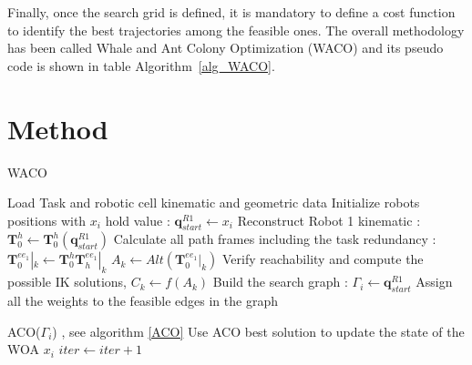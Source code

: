 \documentclass[twocolumn]{svjour3}
\newcommand{\R}[1]{R#1}
\newcommand{\RA}{\R{1}}
\newcommand{\RB}{\R{2}}
\newcommand{\qrA}{\mathbf{q}^{\RA}}
\newcommand{\Tr}[2]{\mathbf{T}^{#2}_{#1}}
\newcommand{\ToolRk}[2]{\Tr{#1}{ee_#2}|_k}
\newcommand{\ToolRAk}[1]{\ToolRk{#1}{1}}
\begin{document}
Finally, once the search grid is defined, it is mandatory to define a cost function to identify the best trajectories among the feasible ones.
The overall methodology has been called Whale and Ant Colony Optimization (WACO) and its pseudo code is shown in table Algorithm~\ref{alg_WACO}.
\section{Method}
\label{WACO}


\begin{algorithm*}[t!]
	\footnotesize
	\caption{WACO}
	\label{alg_WACO}
	\begin{algorithmic}[1]
		\State Load Task and robotic cell kinematic and geometric data
    		    \State Initialize robots positions with $x_i$ hold value : $\qrA_{start} \leftarrow x_i$
        		\State Reconstruct Robot 1 kinematic : $\Tr{0}{h} \leftarrow \Tr{0}{h}(\qrA_{start})$
        		\State Calculate all path frames including the task redundancy :
        		    \State $\ToolRAk{0} \leftarrow \Tr{0}{h} \ToolRAk{h}$
        		    \State  $A_k \leftarrow Alt\left(\ToolRAk{0}\right)$
        		    \hspace{25em}
        		    \State Verify reachability and compute the possible IK solutions, $C_k \leftarrow f(A_k)$
        		\EndFor
        		\State Build the search graph : $\Gamma_i \leftarrow \qrA_{start}$
        		\State Assign all the weights to the feasible edges in the graph
        		        
        		\State ACO($\Gamma_i$) , see algorithm \ref{ACO}
        		\State Use ACO best solution to update the state of the WOA $x_i$
    		\EndFor
    		\State $iter \longleftarrow iter+1$
		\EndWhile
		\EndFunction~
	\end{algorithmic}
\end{algorithm*}
\end{document}
